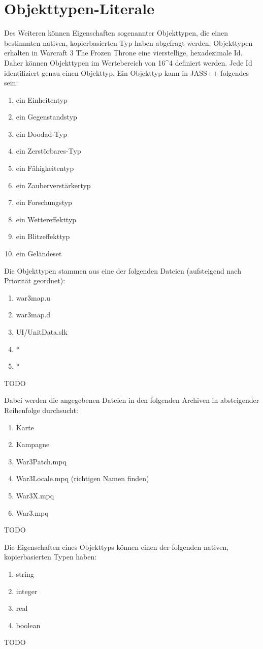 \section{Objekttypen-Literale}
Des Weiteren können Eigenschaften sogenannter Objekttypen, die einen bestimmten nativen, kopierbasierten Typ haben abgefragt werden.
Objekttypen erhalten in Warcraft 3 The Frozen Throne eine vierstellige, hexadezimale Id. Daher können Objekttypen im Wertebereich von 16^4 definiert werden.
Jede Id identifiziert genau einen Objekttyp.
Ein Objekttyp kann in JASS++ folgendes sein:
\begin{enumerate}
\item ein Einheitentyp
\item ein Gegenstandstyp
\item ein Doodad-Typ
\item ein Zerstörbares-Typ
\item ein Fähigkeitentyp
\item ein Zauberverstärkertyp
\item ein Forschungstyp
\item ein Wettereffekttyp
\item ein Blitzeffekttyp
\item ein Geländeset
\end{enumerate}

Die Objekttypen stammen aus eine der folgenden Dateien (aufsteigend nach Priorität geordnet):
\begin{enumerate}
\item war3map.u
\item war3map.d
\item UI/UnitData.slk
\item *
\item *
\end{enumerate}
TODO

Dabei werden die angegebenen Dateien in den folgenden Archiven in absteigender Reihenfolge durchsucht:
\begin{enumerate}
\item Karte
\item Kampagne
\item War3Patch.mpq
\item War3Locale.mpq (richtigen Namen finden)
\item War3X.mpq
\item War3.mpq
\end{enumerate}
TODO

Die Eigenschaften eines Objekttyps können einen der folgenden nativen, kopierbasierten Typen haben:
\begin{enumerate}
\item string
\item integer
\item real
\item boolean
\end{enumerate}
TODO

